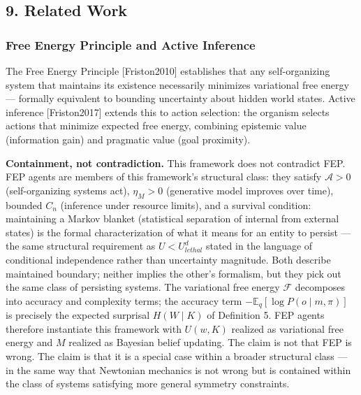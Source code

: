 \documentclass[
]{article}
\begin{document}
\subsection{9. Related Work}\label{related-work}

\subsubsection{Free Energy Principle and Active
Inference}\label{free-energy-principle-and-active-inference}

The Free Energy Principle {[}Friston2010{]} establishes that any
self-organizing system that maintains its existence necessarily
minimizes variational free energy --- formally equivalent to bounding
uncertainty about hidden world states. Active inference
{[}Friston2017{]} extends this to action selection: the organism selects
actions that minimize expected free energy, combining epistemic value
(information gain) and pragmatic value (goal proximity).

\textbf{Containment, not contradiction.} This framework does not
contradict FEP. FEP agents are members of this framework's structural
class: they satisfy \(\mathcal{A} > 0\) (self-organizing systems act),
\(\eta_M > 0\) (generative model improves over time), bounded \(C_n\)
(inference under resource limits), and a survival condition: maintaining
a Markov blanket (statistical separation of internal from external
states) is the formal characterization of what it means for an entity to
persist --- the same structural requirement as \(U < U_{lethal}^d\)
stated in the language of conditional independence rather than
uncertainty magnitude. Both describe maintained boundary; neither
implies the other's formalism, but they pick out the same class of
persisting systems. The variational free energy \(\mathcal{F}\)
decomposes into accuracy and complexity terms; the accuracy term
\(-\mathbb{E}_q[\log P(o \mid m, \pi)]\) is precisely the expected
surprisal \(H(W \mid K)\) of Definition 5. FEP agents therefore
instantiate this framework with \(U(w,K)\) realized as variational free
energy and \(M\) realized as Bayesian belief updating. The claim is not
that FEP is wrong. The claim is that it is a special case within a
broader structural class --- in the same way that Newtonian mechanics is
not wrong but is contained within the class of systems satisfying more
general symmetry constraints.
\end{document}
